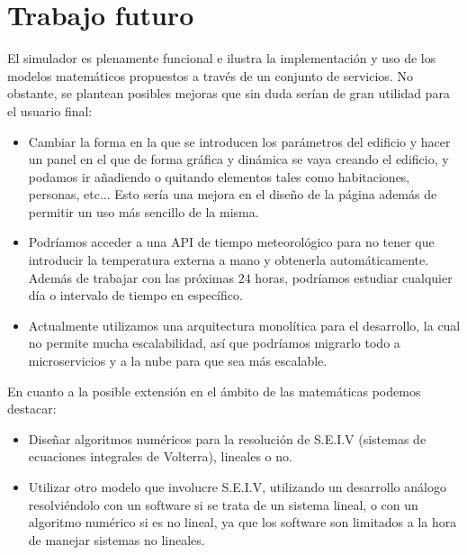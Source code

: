 \section{Trabajo futuro}
El simulador es plenamente funcional e ilustra la implementación y uso de los modelos matemáticos propuestos a través de un conjunto de servicios. No obstante, se plantean posibles mejoras que sin duda serían de gran utilidad para el usuario final:
\begin{itemize}
	\item Cambiar la forma en la que se introducen los parámetros del edificio y hacer un panel en el que de forma gráfica y dinámica se vaya creando el edificio, y podamos ir añadiendo o quitando elementos tales como habitaciones, personas, etc... Esto sería una mejora en el diseño de la página además de permitir un uso más sencillo de la misma.
	\item Podríamos acceder a una API de tiempo meteorológico para no tener que introducir la temperatura externa a mano y obtenerla automáticamente. Además de trabajar con las próximas $24$ horas, podríamos estudiar cualquier día o intervalo de tiempo en específico.
	\item Actualmente utilizamos una arquitectura monolítica para el desarrollo, la cual no permite mucha escalabilidad, así que podríamos migrarlo todo a microservicios y a la nube para que sea más escalable.
\end{itemize}
En cuanto a la posible extensión en el ámbito de las matemáticas podemos destacar:
\begin{itemize}
	\item Diseñar algoritmos numéricos para la resolución de S.E.I.V (sistemas de ecuaciones integrales de Volterra), lineales o no.
	\item Utilizar otro modelo que involucre S.E.I.V, utilizando un desarrollo análogo resolviéndolo con un software si se trata de un sistema lineal, o con un algoritmo numérico si es no lineal, ya que los software son limitados a la hora de manejar sistemas no lineales.
\end{itemize}
\endinput
